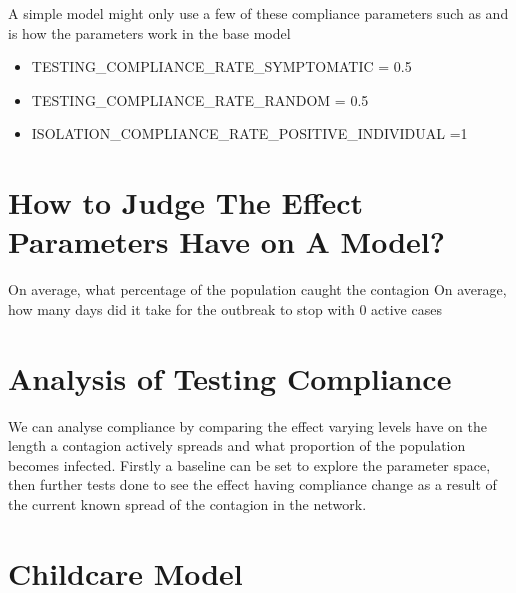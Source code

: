 \documentclass{article}
\begin{document}
A simple model might only use a few of these compliance parameters such as  and is how the parameters work in the base model
\begin{itemize}
\item TESTING\_COMPLIANCE\_RATE\_SYMPTOMATIC = 0.5\
\item TESTING\_COMPLIANCE\_RATE\_RANDOM = 0.5
\item ISOLATION\_COMPLIANCE\_RATE\_POSITIVE\_INDIVIDUAL =1
\end{itemize}


\section{How to Judge The Effect Parameters Have on A Model?}
On average, what percentage of the population caught the contagion
On average, how many days did it take for the outbreak to stop with 0 active cases

\section{Analysis of Testing Compliance}
We can analyse compliance by comparing the effect varying levels have on the length a contagion actively spreads and what proportion of the population becomes infected. Firstly a baseline can be set to explore the parameter space, then further tests done to see the effect having compliance change as a result of the current known spread of the contagion in the network.


\section{Childcare Model}
\end{document}
